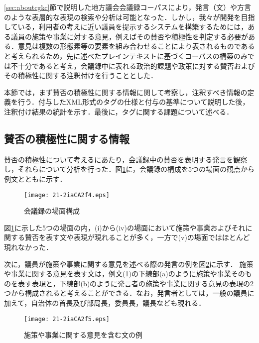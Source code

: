 \documentclass[japanese]{jnlp_1.4}
\begin{document}
\ref{sec:aboutcgkc}節で説明した地方議会会議録コーパスにより，発言（文）や方言のような表層的な表現の検索や分析は可能となった．しかし，我々が開発を目指している，利用者の考えに近い議員を提示するシステムを構築するためには，ある議員の施策や事業に対する意見，例えばその賛否や積極性を判定する必要がある．意見は複数の形態素等の要素を組み合わせることにより表されるものであると考えられるため，先に述べたプレインテキストに基づくコーパスの構築のみでは不十分であると考え，会議録中に表れる政治的課題や政策に対する賛否およびその積極性に関する注釈付けを行うこととした．

本節では，まず賛否の積極性に関する情報に関して考察し，注釈すべき情報の定義を行う．付与したXML形式のタグの仕様と付与の基準について説明した後，注釈付け結果の統計を示す．最後に，タグに関する課題について述べる．


\subsection{賛否の積極性に関する情報}
\label{ssec:info}

賛否の積極性について考えるにあたり，会議録中の賛否を表明する発言を観察し，それらについて分析を行った．図\ref{fig:eg_bamen}に，会議録の構成を5つの場面の観点から例文とともに示す．

\begin{figure}[b]
 \begin{center}
 \texttt{[image: 21-2iaCA2f4.eps]}
 \end{center}
\caption{会議録の場面構成}
\label{fig:eg_bamen}
\end{figure}

図\ref{fig:eg_bamen}に示した5つの場面の内，(i)から(iv)の場面において施策や事業およびそれに関する賛否を表す文や表現が現れることが多く，一方で(v)の場面ではほとんど現れなかった．

次に，議員が施策や事業に関する意見を述べる際の発言の例を図\ref{fig:eg_sentence}に示す．
施策や事業に関する意見を表す文は，例文(1)の下線部(a)のように施策や事業そのものを表す表現と，下線部(b)のように発言者の施策や事業に関する意見の表現の2つから構成されると考えることができる．なお，発言者としては，一般の議員に加えて，自治体の首長及び部局長，委員長，議長なども現れる．

\begin{figure}[t]
 \begin{center}
 \texttt{[image: 21-2iaCA2f5.eps]}
 \end{center}
\caption{施策や事業に関する意見を含む文の例}
\label{fig:eg_sentence}
\end{figure}
\end{document}
